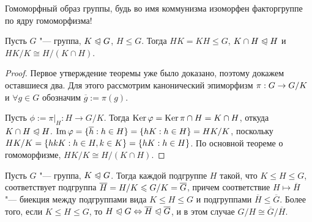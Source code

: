 \begin{note}
	Гомоморфный образ группы, будь во имя коммунизма изоморфен факторгруппе по ядру гомоморфизма!
\end{note}

\begin{theorem}
	Пусть $G$ "--- группа, $K \trianglelefteqslant G$, $H \le G$. Тогда $HK = KH \le G$, $K \cap H \trianglelefteqslant H$ и $HK / K \cong H / (K \cap H)$.
\end{theorem}

\begin{proof}
	Первое утверждение теоремы уже было доказано, поэтому докажем оставшиеся два. Для этого рассмотрим канонический эпиморфизм $\pi: G \hm\to G / K$ и $\forall g \in G$ обозначим $\overline{g} := \pi(g)$.
	
	Пусть $\phi := \pi|_H : H \to G/ K$. Тогда $\operatorname{Ker}\varphi = \operatorname{Ker}\pi \cap H = K \cap H$, откуда $K \cap H \trianglelefteqslant H$. $\im\phi = \{\overline{h}: h \in H\} = \{hK: h \hm\in H\} = HK / K$, поскольку $HK / K \hm= \{hkK: h \in H, k \hm\in K\} = \{hK: h \in H\}$. По основной теореме о гомоморфизме, $HK / K \cong H / (K \cap H)$.
\end{proof}

\begin{theorem}
	Пусть $G$ "--- группа, $K \trianglelefteqslant G$. Тогда каждой подгруппе $H$ такой, что $K \le H \le G$, соответствует подгруппа $\overline{H} = H / K \hm\le G / K = \overline{G}$, причем соответствие $H \mapsto \overline{H}$ "--- биекция между подгруппами вида $K \le H \le G$ и подгруппами $\overline{H} \le \overline{G}$. Более того, если $K \le H \le G$, то $H \trianglelefteqslant G \Leftrightarrow \overline{H} \trianglelefteqslant \overline{G}$, и в этом случае $G / H \cong \overline{G} / \overline{H}$.
\end{theorem}

